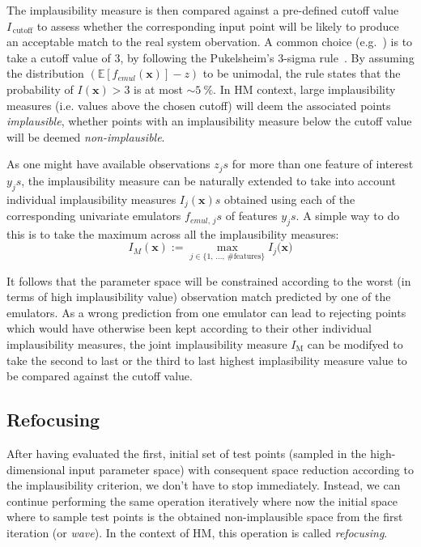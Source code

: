 \noindent
The implausibility measure is then compared against a pre-defined cutoff value $I_{\,\text{cutoff}}$ to assess whether the corresponding input point will be likely to produce an acceptable match to the real system obervation. A common choice (e.g.~\cite{Vernon:2010,Andrianakis:2015,Coveney:2018}) is to take a cutoff value of $3$, by following the Pukelsheim's $3$-sigma rule~\cite{Pukelsheim:1994}. By assuming the distribution $(\mathbb{E}[f_{emul}(\mathbf{x})]-z)$ to be unimodal, the rule states that the probability of $I(\mathbf{x})>3$ is at most $\sim\SI{5}{\percent}$. In HM context, large implausibility measures (i.e. values above the chosen cutoff) will deem the associated points \textit{implausible}, whether points with an implausibility measure below the cutoff value will be deemed \textit{non-implausible}. 

\vspace{0.2cm}
As one might have available observations $z_js$ for more than one feature of interest $y_js$, the implausibility measure can be naturally extended to take into account individual implausibility measures $I_j(\mathbf{x})s$ obtained using each of the corresponding univariate emulators $f_{emul,\,j}s$ of features $y_js$. A simple way to do this is to take the maximum across all the implausibility measures: 
%
\begin{equation}\label{eq:maximplmeasure}
    I_{M}(\mathbf{x}) := \max_{j\in\{1,\,\dots,\,\#\textrm{features}\}}{I_j(\mathbf{x}})
\end{equation}

\noindent
It follows that the parameter space will be constrained according to the worst (in terms of high implausibility value) observation match predicted by one of the emulators. As a wrong prediction from one emulator can lead to rejecting points which would have otherwise been kept according to their other individual implausibility measures, the joint implausibility measure $I_{\text{M}}$ can be modifyed to take the second to last or the third to last highest implasibility measure value to be compared against the cutoff value.


%
%
%
\subsection{Refocusing}\label{sec:ch3refocusing}
After having evaluated the first, initial set of test points (sampled in the high-dimensional input parameter space) with consequent space reduction according to the implausibility criterion, we don't have to stop immediately. Instead, we can continue performing the same operation iteratively where now the initial space where to sample test points is the obtained non-implausible space from the first iteration (or \textit{wave}). In the context of HM, this operation is called \textit{refocusing}.

